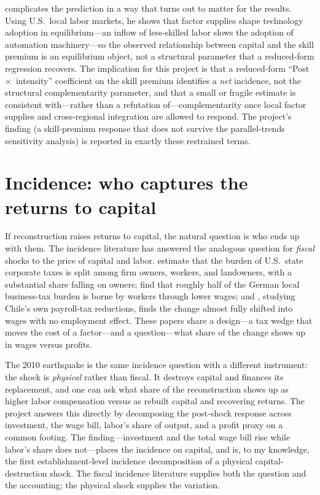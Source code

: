 \documentclass[12pt]{article}
\begin{document}
\citet{lewis2011} complicates the prediction in a way that turns out to matter for the results.
Using U.S.\ local labor markets, he shows that factor supplies shape technology adoption in
equilibrium---an inflow of less-skilled labor slows the adoption of automation machinery---so the
observed relationship between capital and the skill premium is an equilibrium object, not a
structural parameter that a reduced-form regression recovers. The implication for this project is
that a reduced-form ``Post~$\times$~intensity'' coefficient on the skill premium identifies a
\emph{net} incidence, not the structural complementarity parameter, and that a small or fragile
estimate is consistent with---rather than a refutation of---complementarity once local factor
supplies and cross-regional integration are allowed to respond. The project's finding (a
skill-premium response that does not survive the parallel-trends sensitivity analysis) is
reported in exactly these restrained terms.

\section{Incidence: who captures the returns to capital}

If reconstruction raises returns to capital, the natural question is who ends up with them. The
incidence literature has answered the analogous question for \emph{fiscal} shocks to the price of
capital and labor. \citet{suarezzidar2016} estimate that the burden of U.S.\ state corporate
taxes is split among firm owners, workers, and landowners, with a substantial share falling on
owners; \citet{fuest2018} find that roughly half of the German local business-tax burden is
borne by workers through lower wages; and \citet{gruber1997}, studying Chile's own payroll-tax
reductions, finds the change almost fully shifted into wages with no employment effect. These
papers share a design---a tax wedge that moves the cost of a factor---and a question---what share
of the change shows up in wages versus profits.

The 2010 earthquake is the same incidence question with a different instrument: the shock is
\emph{physical} rather than fiscal. It destroys capital and finances its replacement, and one can
ask what share of the reconstruction shows up as higher labor compensation versus as
rebuilt capital and recovering returns. The project answers this directly by decomposing the
post-shock response across investment, the wage bill, labor's share of output, and a profit
proxy on a common footing. The finding---investment and the total wage bill rise while labor's
share does not---places the incidence on capital, and is, to my knowledge, the first
establishment-level incidence decomposition of a physical capital-destruction shock. The fiscal
incidence literature supplies both the question and the accounting; the physical shock supplies
the variation.
\end{document}
